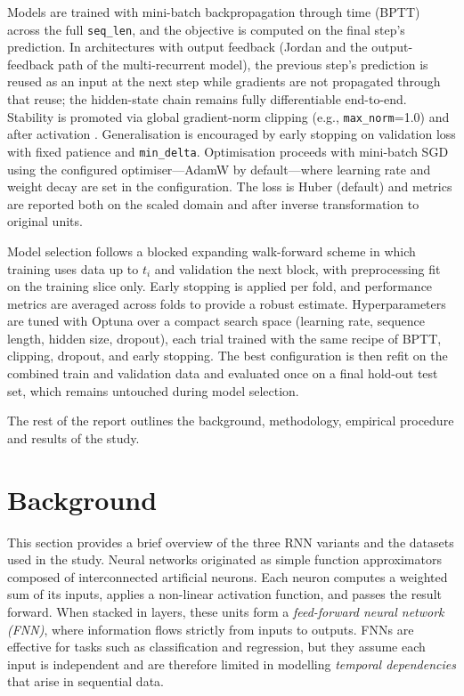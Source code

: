 \documentclass[conference]{IEEEtran}
\begin{document}
Models are trained with mini-batch backpropagation through time (BPTT) across the full \texttt{seq\_len}, and the objective is computed on the final step’s prediction. In architectures with output feedback (Jordan and the output-feedback path of the multi-recurrent model), the previous step’s prediction is reused as an input at the next step while gradients are not propagated through that reuse; the hidden-state chain remains fully differentiable end-to-end. Stability is promoted via global gradient-norm clipping (e.g., \texttt{max\_norm}=1.0) and  after activation . Generalisation is encouraged by early stopping on validation loss with fixed patience and \texttt{min\_delta}. Optimisation proceeds with mini-batch SGD using the configured optimiser—AdamW by default—where learning rate and weight decay are set in the configuration. The loss is Huber (default) and metrics are reported both on the scaled domain and after inverse transformation to original units.

Model selection follows a blocked expanding walk-forward scheme in which training uses data up to $t_i$ and validation the next block, with preprocessing fit on the training slice only. Early stopping is applied per fold, and performance metrics are averaged across folds to provide a robust estimate. Hyperparameters are tuned with Optuna over a compact search space (learning rate, sequence length, hidden size, dropout), each trial trained with the same recipe of BPTT, clipping, dropout, and early stopping. The best configuration is then refit on the combined train and validation data and evaluated once on a final hold-out test set, which remains untouched during model selection.  

The rest of the report outlines the background, methodology, empirical procedure and results of the study.

\section{\textbf{Background}}
This section provides a brief overview of the three RNN variants and the datasets used in the study.
\smallbreak
Neural networks originated as simple function approximators composed of interconnected artificial neurons. Each neuron computes a weighted sum of its inputs, applies a non-linear activation function, and passes the result forward. When stacked in layers, these units form a \textit{feed-forward neural network (FNN)}, where information flows strictly from inputs to outputs. FNNs are effective for tasks such as classification and regression, but they assume each input is independent and are therefore limited in modelling \textit{temporal dependencies} that arise in sequential data.
\end{document}
